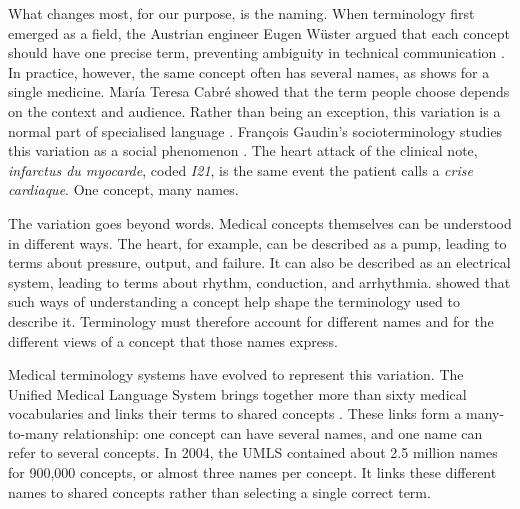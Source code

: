 \begin{reviewread}
What changes most, for our purpose, is the naming.
When terminology first emerged as a field, the Austrian engineer Eugen Wüster argued that each concept should have one precise term, preventing ambiguity in technical communication \citep{wuster_einfuhrung_1979}.
In practice, however, the same concept often has several names, as  shows for a single medicine.
María Teresa Cabré showed that the term people choose depends on the context and audience.
Rather than being an exception, this variation is a normal part of specialised language \citep{cabre_theories_2003}.
François Gaudin's socioterminology studies this variation as a social phenomenon \citep{gaudin_socioterminologie_2003}.
The heart attack of the clinical note, \emph{infarctus du myocarde}, coded \emph{I21}, is the same event the patient calls a \emph{crise cardiaque}.
One concept, many names.
\end{reviewread}

\begin{reviewread}
The variation goes beyond words.
Medical concepts themselves can be understood in different ways.
The heart, for example, can be described as a pump, leading to terms about pressure, output, and failure.
It can also be described as an electrical system, leading to terms about rhythm, conduction, and arrhythmia.
\citet{temmerman_towards_2000} showed that such ways of understanding a concept help shape the terminology used to describe it.
Terminology must therefore account for different names and for the different views of a concept that those names express.
\end{reviewread}

\begin{reviewread}
Medical terminology systems have evolved to represent this variation.
The Unified Medical Language System brings together more than sixty medical vocabularies and links their terms to shared concepts \citep{bodenreider_unified_2004}.
These links form a many-to-many relationship: one concept can have several names, and one name can refer to several concepts.
In 2004, the UMLS contained about 2.5 million names for 900{,}000 concepts, or almost three names per concept.
It links these different names to shared concepts rather than selecting a single correct term.
\end{reviewread}

